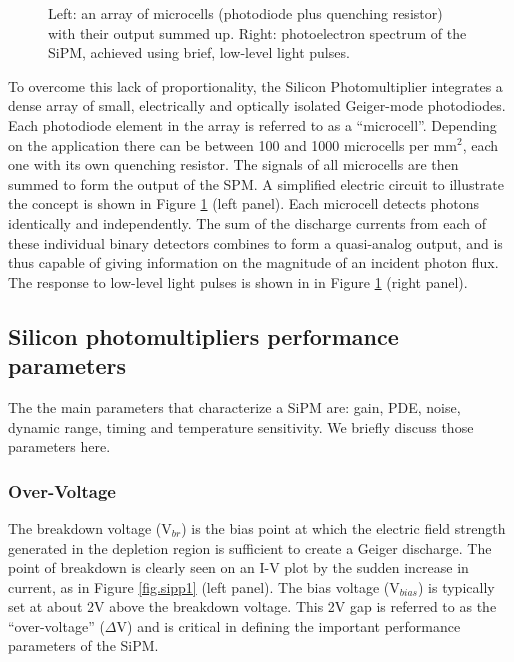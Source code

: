 \begin{figure}[!bhtp]
	\caption{\label{fig.sipmc} Left: an array of microcells (photodiode plus quenching resistor) with their output summed up. Right: photoelectron spectrum of the SiPM, achieved using brief, low-level light pulses.}
\end{figure}

To overcome this lack of proportionality, the Silicon Photomultiplier integrates a dense array of small, electrically and optically isolated Geiger-mode photodiodes. Each photodiode element in the array is referred to as a ``microcell''. Depending on the application there can be between 100 and 1000 microcells per mm$^2$, each one with  its own quenching resistor. The signals of all microcells are then summed to form the output of the SPM. A simplified electric circuit to illustrate the concept is shown in Figure \ref{fig.sipmc} (left panel). Each microcell detects photons identically and independently. The sum of the discharge currents from each of these individual binary detectors combines to form a quasi-analog output, and is thus capable of giving information on the magnitude of an incident photon flux. The response to low-level light pulses is shown in in Figure \ref{fig.sipmc} (right panel).

\subsection{Silicon photomultipliers performance parameters}
The the main parameters that characterize a SiPM are: gain, PDE, noise, dynamic range, timing and temperature sensitivity. We briefly discuss those parameters here.

\subsubsection*{Over-Voltage}
The breakdown voltage (V$_{br}$) is the bias point at which the electric field strength generated in the depletion region is sufficient to create a Geiger discharge. The point of breakdown is clearly seen on an I-V plot by the sudden increase in current, as in 
Figure \ref{fig.sipp1} (left panel). The bias voltage (V$_{bias}$) is typically set at about 2V above the breakdown voltage. This 2V gap is referred to as the ``over-voltage'' 
($\Delta$V) and is critical in defining the important performance parameters of the SiPM.


